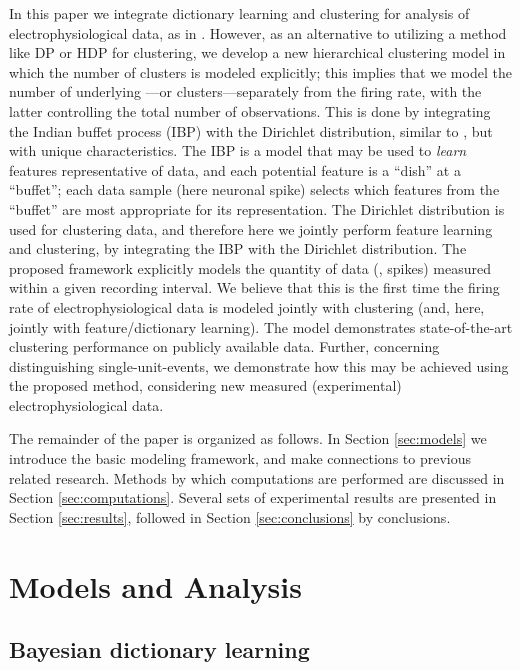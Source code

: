 \documentclass[journal]{IEEEtran}
\begin{document}
In this paper we integrate dictionary learning and clustering for analysis of electrophysiological data, as in \cite{Dilan,Bo2011}. However, as an alternative to utilizing a method like DP or HDP \cite{Wood2009,Bo2011} for clustering, we develop a new hierarchical clustering model in which the number of clusters is modeled explicitly; this implies that we model the number of underlying ---or clusters---separately from the firing rate, with the latter controlling the total number of observations. This is done by integrating the Indian buffet process (IBP) \cite{IBP} with the Dirichlet distribution, similar to \cite{compound}, but with unique characteristics. The IBP is a model that may be used to \emph{learn} features representative of data, and each potential feature is a ``dish'' at a ``buffet''; each data sample (here  neuronal spike) selects which features from the ``buffet'' are most appropriate for its representation. The Dirichlet distribution is used for clustering data, and therefore here we jointly perform feature learning and clustering, by integrating the IBP with the Dirichlet distribution. The proposed framework explicitly models the quantity of data (, spikes) measured within a given recording interval. We believe that this is the first time the firing rate of electrophysiological data is modeled jointly with clustering (and, here, jointly with feature/dictionary learning). The model demonstrates state-of-the-art clustering performance on publicly available data. Further, concerning distinguishing single-unit-events, we demonstrate how this may be achieved using the proposed method, considering new measured (experimental) electrophysiological data.

The remainder of the paper is organized as follows. In Section \ref{sec:models} we introduce the basic modeling framework, and make connections to previous related research. Methods by which computations are performed are discussed in Section \ref{sec:computations}.
Several sets of experimental results are presented in Section \ref{sec:results}, followed in Section \ref{sec:conclusions} by conclusions.

\section{Models and Analysis\label{sec:models}}

\subsection{Bayesian dictionary learning\label{sec:dict}}
\end{document}
